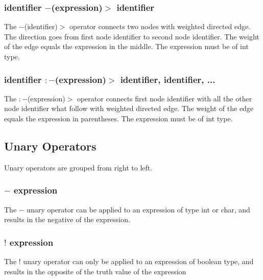 \documentclass[a4paper,12pt]{article}
\begin{document}

\subsubsection{identifier $-$(expression)$>$ identifier}
The $-$(identifier)$>$ operator connects two nodes with weighted directed edge. The direction goes from first node identifier to second node identifier. The weight of the edge equals the expression in the middle. The expression must be of int type.


\subsubsection{identifier $:-$(expression)$>$ identifier, identifier, ... }
The $:-$(expression)$>$ operator connects first node identifier with all the other node identifier what follow with weighted directed edge. The weight of the edge equals the expression in parentheses. The expression must be of int type.

\subsection{Unary Operators}
Unary operators are grouped from right to left.
\subsubsection{$-$ expression}
The $-$ unary operator can be applied to an expression of type int or char, and results in the negative of the expression.

\subsubsection{$!$ expression}
The $!$ unary operator can only be applied to an expression of boolean type, and results in the opposite of the truth value of the expression
\end{document}
